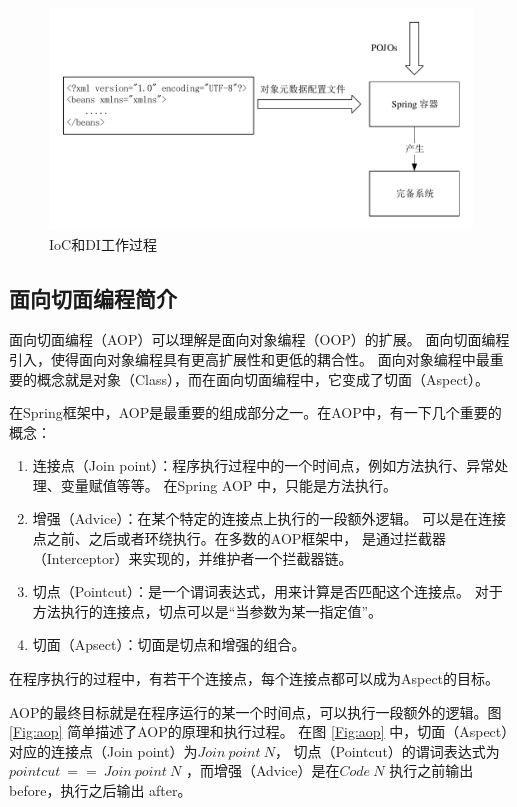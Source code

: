 \begin{figure}[ht]
    \centering   
    \includegraphics[width=1\linewidth]{./Figure/IMG_container.pdf}
    \caption{IoC和DI工作过程}\label{Fig:container}
\end{figure}

\subsection{面向切面编程简介}
面向切面编程（AOP）可以理解是面向对象编程（OOP）的扩展。
面向切面编程引入，使得面向对象编程具有更高扩展性和更低的耦合性。
面向对象编程中最重要的概念就是对象（Class），而在面向切面编程中，它变成了切面（Aspect）。

在Spring框架中，AOP是最重要的组成部分之一。在AOP中，有一下几个重要的概念：
\begin{enumerate}
    \item 连接点（Join point）：程序执行过程中的一个时间点，例如方法执行、异常处理、变量赋值等等。
    在Spring AOP 中，只能是方法执行。
    \item 增强（Advice）：在某个特定的连接点上执行的一段额外逻辑。
    可以是在连接点之前、之后或者环绕执行。在多数的AOP框架中，
    是通过拦截器（Interceptor）来实现的，并维护者一个拦截器链。
    \item 切点（Pointcut）：是一个谓词表达式，用来计算是否匹配这个连接点。
    对于方法执行的连接点，切点可以是“当参数为某一指定值”。
    \item 切面（Apsect）：切面是切点和增强的组合。
\end{enumerate}

在程序执行的过程中，有若干个连接点，每个连接点都可以成为Aspect的目标。

\newpage
AOP的最终目标就是在程序运行的某一个时间点，可以执行一段额外的逻辑。图 \ref{Fig:aop} 
简单描述了AOP的原理和执行过程。
在图 \ref{Fig:aop} 中，切面（Aspect）对应的连接点（Join point）为$Join\ point\ N$，
切点（Pointcut）的谓词表达式为$ pointcut\ ==\ Join\ point\ N$
，而增强（Advice）是在$Code\ N$ 执行之前输出 before，执行之后输出 after。

